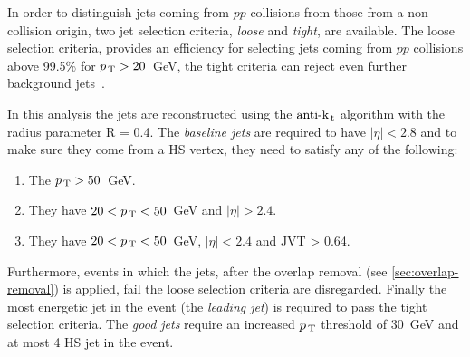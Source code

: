 In order to distinguish jets coming from $pp$ collisions from those from a
non-collision origin, two jet selection criteria, \emph{loose} and \emph{tight},
are available. The loose selection criteria, provides an efficiency for
selecting jets coming from $pp$ collisions above 99.5\% for $p_\mathrm{\, T} > 20$~GeV, the
tight criteria can reject even further background jets~\cite{JetEff}.

In this analysis the jets are reconstructed using the $\text{anti-k}_\mathrm{\, t}$ algorithm with
the radius parameter R = 0.4. The \emph{baseline jets} are required to have
$|\eta| < 2.8$ and to make sure they come from a HS vertex, they need to satisfy
any of the following:
\begin{enumerate}[A -]
  \item The $p_\mathrm{\, T} > 50$~GeV.
  \item They have $20 < p_\mathrm{\, T} < 50$~GeV and $|\eta| > 2.4$.
  \item They have $20 < p_\mathrm{\, T} < 50$~GeV, $|\eta| < 2.4$ and JVT > 0.64.
\end{enumerate}
Furthermore, events in which the jets, after the overlap removal (see
\cref{sec:overlap-removal}) is applied, fail the loose selection criteria are
disregarded. Finally the most energetic jet in the event (the \emph{leading
  jet}) is required to pass the tight selection criteria. The \emph{good jets}
require an increased $p_\mathrm{\, T}$ threshold of 30~GeV and at most 4 HS jet in the
event.

